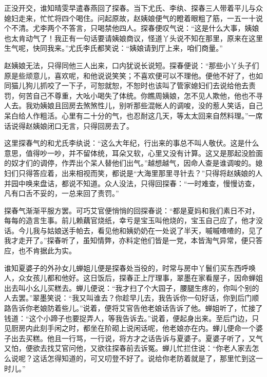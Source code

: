 正没开交，谁知晴雯早遣春燕回了探春。当下尤氏、李纨、探春三人带着平儿与众媳妇走来，忙忙将四个喝住。问起原故，赵姨娘便气的瞪着眼粗了筋，一五一十说个不清。尤李两个不答言，只喝禁他四人。探春便叹气说：``这是什么大事，姨娘也太肯动气了！我正有一句话要请姨娘商议，怪道丫头说不知在那里，原来在这里生气呢，快同我来。''尤氏李氏都笑说：``姨娘请到厅上来，咱们商量。''

赵姨娘无法，只得同他三人出来，口内犹说长说短。探春便说：``那些小丫头子们原是些顽意儿，喜欢呢，和他说说笑笑；不喜欢便可以不理他。便他不好了，也如同猫儿狗儿抓咬了一下子，可恕就恕，不恕时也该叫了管家媳妇们去说给他去责罚，何苦自己不尊重，大吆小喝失了体统。你瞧周姨娘，怎不见人欺他，他也不寻人去。我劝姨娘且回房去煞煞性儿，别听那些混帐人的调唆，没的惹人笑话，自己呆白给人作粗活。心里有二十分的气，也忍耐这几天，等太太回来自然料理。''一席话说得赵姨娘闭口无言，只得回房去了。

这里探春气的和尤氏李纨说：``这么大年纪，行出来的事总不叫人敬伏。这是什么意思，值得吵一吵，并不留体统，耳朵又软，心里又没有计算。这又是那起没脸面的奴才们的调停，作弄出个呆人替他们出气。''越想越气，因命人查是谁调唆的。媳妇们只得答应着，出来相视而笑，都说是``大海里那里寻针去？''只得将赵姨娘的人并园中唤来盘诘，都说不知道。众人没法，只得回探春：``一时难查，慢慢访查，凡有口舌不妥的，一总来回了责罚。''

探春气渐渐平服方罢。可巧艾官便悄悄的回探春说：``都是夏妈和我们素日不对，每每的造言生事。前儿赖藕官烧纸，幸亏是宝玉叫他烧的，宝玉自己应了，他才没话。今儿我与姑娘送手帕去，看见他和姨奶奶在一处说了半天，嘁嘁喳喳的，见了我才走开了。''探春听了，虽知情弊，亦料定他们皆是一党，本皆淘气异常，便只答应，也不肯据此为实。

谁知夏婆子的外孙女儿蝉姐儿便是探春处当役的，时常与房中丫鬟们买东西呼唤人，众女孩儿都和他好。这日饭后，探春正上厅理事，翠墨在家看屋子，因命蝉姐出去叫小幺儿买糕去。蝉儿便说：``我才扫了个大园子，腰腿生疼的，你叫个别的人去罢。''翠墨笑说：``我又叫谁去？你趁早儿去，我告诉你一句好话，你到后门顺路告诉你老娘防着些儿。''说着，便将艾官告他老娘话告诉了他。蝉姐听了，忙接了钱道：``这个小蹄子也要捉弄人，等我告诉去。''说着，便起身出来。至后门边，只见厨房内此刻手闲之时，都坐在阶砌上说闲话呢，他老娘亦在内。蝉儿便命一个婆子出去买糕。他且一行骂，一行说，将方才之话告诉与夏婆子。夏婆子听了，又气又怕，便欲去找艾官问他，又欲往探春前去诉冤。蝉儿忙拦住说：``你老人家去怎么说呢？这话怎得知道的，可又叨登不好了。说给你老防着就是了，那里忙到这一时儿。''

